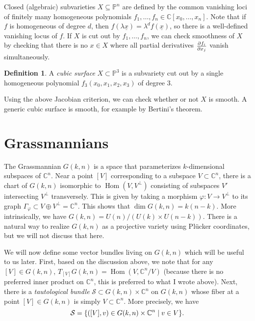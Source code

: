 \documentclass{amsart}
\theoremstyle{definition}
\newtheorem{defn}[thm]{Definition}
\theoremstyle{remark}
\theoremstyle{plain}
\theoremstyle{definition}
\theoremstyle{remark}
\newcommand{\C}{\mathbb{C}}
\renewcommand{\P}{\mathbb{P}}
\newcommand{\mc}[1]{\mathcal{#1}}
\newcommand{\ul}[1]{\underline{#1}}
\newcommand{\1}{\mathbf{1}}
\newcommand{\2}{\mathbf{2}}
\newcommand{\3}{\mathbf{3}}
\DeclareMathOperator{\Hom}{Hom}
\begin{document}
Closed (algebraic) subvarieties $X \subseteq \P^n$ are defined by the common vanishing loci of finitely many homogeneous polynomials $f_1, \ldots, f_n \in \C[x_0, \ldots, x_n]$. Note that if $f$ is homogeneous of degree $d$, then $f(\lambda \ul{x}) = \lambda^d f(\ul{x})$, so there is a well-defined vanishing locus of $f$. If $X$ is cut out by $f_1, \ldots, f_n$, we can check smoothness of $X$ by checking that there is no $x \in X$ where all partial derivatives $\pdv{f_i}{x_j}$ vanish simultaneously.

\begin{defn}
    A \textit{cubic surface} $X \subset \P^3$ is a subvariety cut out by a single homogeneous polynomial $f_3(x_0, x_1, x_2, x_3)$ of degree $3$.
\end{defn}

Using the above Jacobian criterion, we can check whether or not $X$ is smooth. A generic cubic surface is smooth, for example by Bertini's theorem.

\section{Grassmannians}

The Grassmannian $G(k, n)$ is a space that parameterizes $k$-dimensional subspaces of $\C^n$. Near a point $[V]$ corresponding to a subspace $V \subset \C^n$, there is a chart of $G(k,n)$ isomorphic to $\Hom(V, V^{\perp})$ consisting of subspaces $V'$ intersecting $V^{\perp}$ transversely. This is given by taking a morphism $\varphi \colon V \to V^{\perp}$ to its graph $\Gamma_{\varphi} \subset V \oplus V^{\perp} = \C^n$. This shows that $\dim G(k,n) = k(n-k)$. More intrinsically, we have $G(k, n) = U(n) / (U(k) \times U(n-k))$. There is a natural way to realize $G(k, n)$ as a projective variety using Pl\"ucker coordinates, but we will not discuss that here.

We will now define some vector bundles living on $G(k,n)$ which will be useful to us later. First, based on the discussion above, we note that for any $[V] \in G(k, n)$, $T_{[V]} G(k, n) = \Hom(V, \C^n/V)$ (because there is no preferred inner product on $\C^n$, this is preferred to what I wrote above). Next, there is a \textit{tautological bundle} $\mc{S} \subset G(k, n) \times \C^n$ on $G(k,n)$ whose fiber at a point $[V] \in G(k, n)$ is simply $V \subset \C^n$. More precisely, we have
\[ \mc{S} = \qty{([V], v) \in G(k, n) \times \C^n \mid v \in V}. \]
\end{document}
